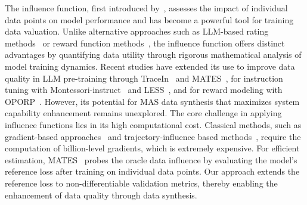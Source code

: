 
The influence function, first introduced by~\cite{hampel1974influence}, assesses the impact of individual data points on model performance and has become a powerful tool for training data valuation. Unlike alternative approaches such as LLM-based rating methods~\cite{liu2024a} or reward function methods~\cite{DBLP:journals/corr/abs-2410-06508}, the influence function offers distinct advantages by quantifying data utility through rigorous mathematical analysis of model training dynamics. Recent studies have extended its use to improve data quality in LLM pre-training through TraceIn~\cite{DBLP:conf/nips/PruthiLKS20} and MATES~\cite{yu2024mates}, for instruction tuning with Montessori-instruct~\cite{DBLP:journals/corr/abs-2410-14208} and LESS~\cite{DBLP:conf/icml/XiaMGA024}, and for reward modeling with OPORP~\cite{min2025understandingimpacthumanfeedback}. However, its potential for MAS data synthesis that maximizes system capability enhancement remains unexplored. The core challenge in applying influence functions lies in its high computational cost. Classical methods, such as gradient-based approaches~\cite{DBLP:conf/icml/KohL17, DBLP:conf/icml/ParkGILM23} and trajectory-influence based methods~\cite{DBLP:journals/corr/abs-2405-12186}, require the computation of billion-level gradients, which is extremely expensive. For efficient estimation, MATES~\cite{yu2024mates} probes the oracle data influence by evaluating the model's reference loss after training on individual data points. Our approach extends the reference loss to non-differentiable validation metrics, thereby enabling the enhancement of data quality through data synthesis.